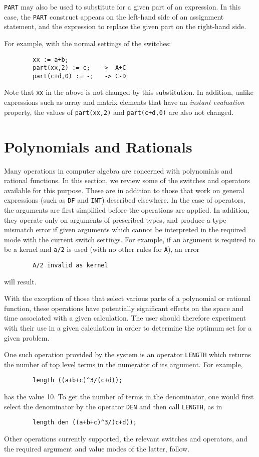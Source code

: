 {\tt PART} may also be used to substitute for a given part of an
expression.  In this case, the {\tt PART} construct appears on the
left-hand side of an assignment statement, and the expression to replace
the given part on the right-hand side.

For example, with the normal settings of the {\REDUCE} switches:
\begin{verbatim}
        xx := a+b;
        part(xx,2) := c;   ->  A+C
        part(c+d,0) := -;   -> C-D
\end{verbatim}

Note that {\tt xx} in the above is not changed by this substitution.  In
addition, unlike expressions such as array and matrix elements that have
an {\em instant evaluation\/} property, the values
of {\tt part(xx,2)} and {\tt part(c+d,0)} are also not changed.
\chapter{Polynomials and Rationals}

Many operations in computer algebra are concerned with polynomials
 and rational functions.  In
this section, we review some of the switches and operators available for
this purpose.  These are in addition to those that work on general
expressions (such as {\tt DF} and {\tt INT}) described elsewhere.  In the
case of operators, the arguments are first simplified before the
operations are applied.  In addition, they operate only on arguments of
prescribed types, and produce a type mismatch error if given arguments
which cannot be interpreted in the required mode with the current switch
settings.  For example, if an argument is required to be a kernel and
{\tt a/2} is used (with no other rules for {\tt A}), an error
\begin{verbatim}
        A/2 invalid as kernel
\end{verbatim}
will result.

With the exception of those that select various parts of a polynomial or
rational function, these operations have potentially significant effects on
the space and time associated with a given calculation. The user should
therefore experiment with their use in a given calculation in order to
determine the optimum set for a given problem.

One such operation provided by the system is an operator {\tt LENGTH}
 which returns the number of top level terms in the
numerator of its argument.  For example,
\begin{verbatim}
        length ((a+b+c)^3/(c+d));
\end{verbatim}
has the value 10.  To get the number of terms in the denominator, one
would first select the denominator by the operator {\tt DEN}
and then call {\tt LENGTH}, as in
\begin{verbatim}
        length den ((a+b+c)^3/(c+d));
\end{verbatim}
Other operations currently supported, the relevant switches and operators,
and the required argument and value modes of the latter, follow.

